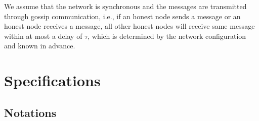 \documentclass{article}
\begin{document}
We assume that the network is synchronous and the messages are transmitted through gossip communication, i.e., if an honest node sends a message or an honest node receives a message, all other honest nodes will receive same message within at most a delay of $\tau$, which is determined by the network configuration and known in advance.

\section{Specifications}
\subsection{Notations}
\renewcommand{\arraystretch}{2}
\end{document}
